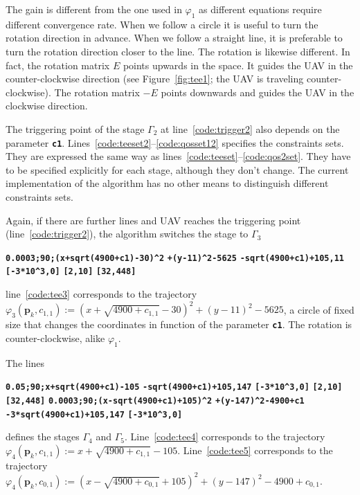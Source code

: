 \documentclass[letterpaper,10pt,conference]{ieeeconf}
\theoremstyle{definition}
\begin{document}
The gain is different from the one used in $\varphi_1$ as different equations require different convergence rate. When we follow a circle it is useful to turn the rotation direction in advance. When we follow a straight line, it is preferable to turn the rotation direction closer to the line. The rotation is likewise different. In fact, the rotation matrix $E$ points upwards in the space. It guides the UAV in the counter-clockwise direction (see Figure~\ref{fig:tee1}; the UAV is traveling counter-clockwise). The rotation matrix $-E$ points downwards and guides the UAV in the clockwise direction.

The triggering point of the stage $\Gamma_2$ at line~\ref{code:trigger2} also depends on the parameter {\tt\textbf{c1}}. Lines~\ref{code:teeset2}--\ref{code:qosset12} specifies the constraints sets. They are expressed the same way as lines~\ref{code:teeset}--\ref{code:qos2set}. They have to be specified explicitly for each stage, although they don't change. The current implementation of the algorithm has no other means to distinguish different constraints sets. 

Again, if there are further lines and UAV reaches the triggering point (line~\ref{code:trigger2}), the algorithm switches the stage to $\Gamma_3$
\begin{algorithmic}[1]
  \STATE\textbf{\texttt{0.0003;90;(x+sqrt(4900+c1)-30)\^{}2}}
  \textbf{\texttt{\hspace*{14ex}+(y-11)\^{}2-5625}}\label{code:tee3}
  \STATE\textbf{\texttt{-sqrt(4900+c1)+105,11}}
  \STATE\textbf{\texttt{[-3*10\^{}3,0]}}
  \STATE\textbf{\texttt{[2,10]}}
  \STATE\textbf{\texttt{[32,448]}}\label{code:qosset32}
\end{algorithmic}
line~\ref{code:tee3} corresponds to the trajectory $\varphi_3(\mathbf{p}_k,c_{1,1}):=(x+\sqrt{4900+c_{1,1}}-30)^2+(y-11)^2-5625$, a circle of fixed size that changes the coordinates in function of the parameter {\tt\textbf{c1}}. The rotation is counter-clockwise, alike $\varphi_1$.

The lines
\begin{algorithmic}[1]
  \STATE\textbf{\texttt{0.05;90;x+sqrt(4900+c1)-105}}\label{code:tee4}
  \STATE\textbf{\texttt{-sqrt(4900+c1)+105,147}}
  \STATE\textbf{\texttt{[-3*10\^{}3,0]}}
  \STATE\textbf{\texttt{[2,10]}}
  \STATE\textbf{\texttt{[32,448]}}\label{code:qosset42}
  \STATE\textbf{\texttt{0.0003;90;(x-sqrt(4900+c1)+105)\^{}2}}
  \textbf{\texttt{\hspace*{14ex}+(y-147)\^{}2-4900+c1}}\label{code:tee5}
  \STATE\textbf{\texttt{-3*sqrt(4900+c1)+105,147}}\label{code:triggerlast}
  \STATE\textbf{\texttt{[-3*10\^{}3,0]}}\label{code:teeset5}
\end{algorithmic}
defines the stages $\Gamma_4$ and $\Gamma_5$. Line~\ref{code:tee4} corresponds to the trajectory $\varphi_4(\mathbf{p}_k,c_{1,1}):=x+\sqrt{4900+c_{1,1}}-105$. Line~\ref{code:tee5} corresponds to the trajectory $\varphi_4(\mathbf{p}_k,c_{0,1}):=(x-\sqrt{4900+c_{0,1}}+105)^2+(y-147)^2-4900+c_{0,1}$.
\end{document}
